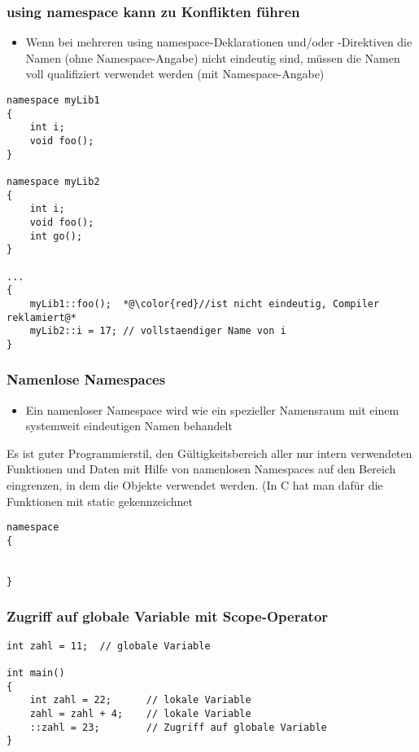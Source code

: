 \subsubsection{using namespace kann zu Konflikten führen\hfill}
\label{sec:using namespace kann zu Konflikten fuehren}
\begin{itemize}
	\item Wenn bei mehreren using namespace-Deklarationen und/oder -Direktiven die Namen (ohne Namespace-Angabe) nicht eindeutig sind, müssen die Namen voll qualifiziert verwendet werden (mit Namespace-Angabe)
\end{itemize}
\noindent
\begin{minipage}{\linewidth}
\begin{lstlisting}
namespace myLib1
{
	int i;
	void foo();
}

namespace myLib2
{
	int i;
	void foo();
	int go();
}

...
{
	myLib1::foo();	*@\color{red}//ist nicht eindeutig, Compiler reklamiert@*
	myLib2::i = 17;	// vollstaendiger Name von i
}
\end{lstlisting}
\end{minipage}

\subsubsection{Namenlose Namespaces\hfill}
\label{sec:Namenlose Namespaces}
\begin{itemize}
	\item Ein namenloser Namespace wird wie ein spezieller Namensraum mit einem systemweit eindeutigen Namen behandelt
\end{itemize}
\begin{hinweis}
Es ist guter Programmierstil, den Gültigkeitsbereich aller nur intern verwendeten Funktionen und Daten mit Hilfe von namenlosen Namespaces auf den Bereich eingrenzen, in dem die Objekte verwendet werden. (In C hat man dafür die Funktionen mit static gekennzeichnet
\end{hinweis}
\noindent
\begin{minipage}{\linewidth}
\begin{lstlisting}
namespace
{


}
\end{lstlisting}
\end{minipage}

\subsubsection{Zugriff auf globale Variable mit Scope-Operator\hfill}
\label{sec:Zugriff auf globale Variable mit Scope-Operator}
\noindent
\begin{minipage}{\linewidth}
\begin{lstlisting}
int zahl = 11;	// globale Variable

int main()
{
	int zahl = 22;		// lokale Variable
	zahl = zahl + 4;	// lokale Variable
	::zahl = 23;		// Zugriff auf globale Variable
}
\end{lstlisting}
\end{minipage}

